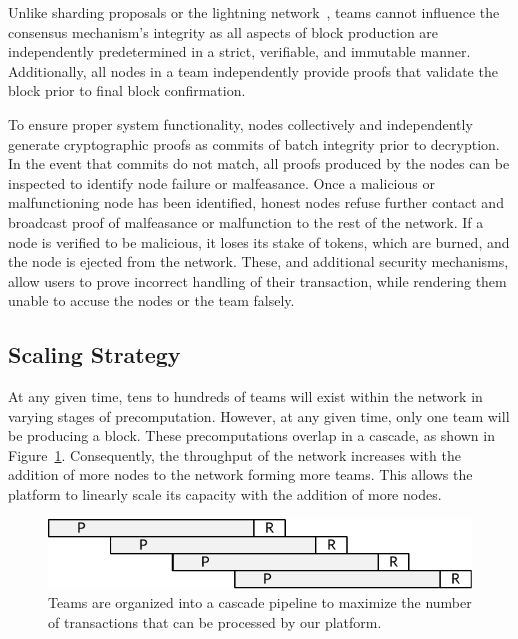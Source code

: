 Unlike sharding proposals or the lightning network~\cite{lightning}, \name teams cannot influence the consensus mechanism's integrity as all aspects of block production are independently predetermined in a strict, verifiable, and immutable manner. Additionally, all nodes in a team independently provide proofs that validate the block prior to final block confirmation. 

To ensure proper system functionality, nodes collectively and independently generate cryptographic proofs as commits of batch integrity prior to decryption. In the event that commits do not match, all proofs produced by the nodes can be inspected to identify node failure or malfeasance. Once a malicious or malfunctioning node has been identified, honest nodes refuse further contact and broadcast proof of malfeasance or malfunction to the rest of the network. If a node is verified to be malicious, it loses its stake of tokens, which are burned, and the node is ejected from the network.  These, and additional security mechanisms, allow users to prove incorrect handling of their transaction, while rendering them unable to accuse the nodes or the team falsely.

\subsection{Scaling Strategy}

At any given time, tens to hundreds of teams will exist within the network in varying stages of precomputation. However, at any given time, only one team will be producing a block. These precomputations overlap in a cascade, as shown in Figure~\ref{figure:processing-cascade}. Consequently, the throughput of the network increases with the addition of more nodes to the network forming more teams. This allows the platform to linearly scale its capacity with the addition of more nodes.

\begin{figure}[H]
    \centering
    \includegraphics[width=\textwidth]{img/Processing-Cascade.pdf}
    \caption{Teams are organized into a cascade pipeline to maximize the number of transactions that can be processed by our platform.}
    \label{figure:processing-cascade}
\end{figure}

